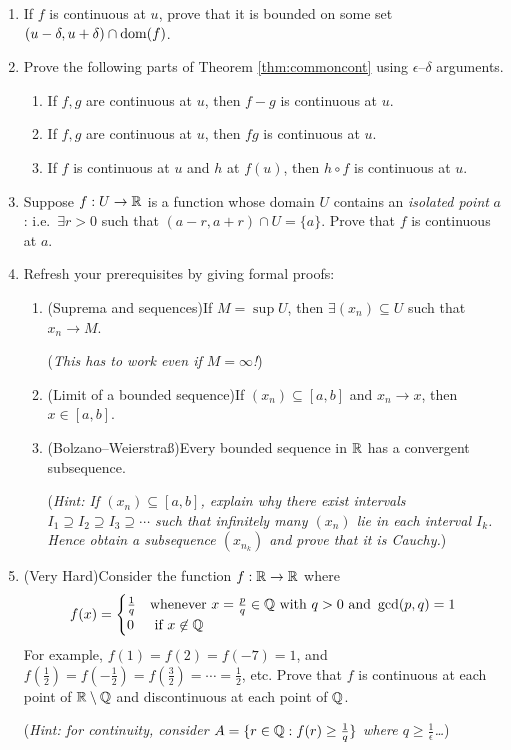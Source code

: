\begin{exercises}
\begin{enumerate}
		
		\item If $f$ is continuous at $u$, prove that it is bounded on some set $(u-\delta,u+\delta)\cap \operatorname{dom}(f)$.
	
	
		\item Prove the following parts of Theorem \ref{thm:commoncont} using $\epsilon$--$\delta$ arguments.
		\begin{enumerate}
	  	\item If $f,g$ are continuous at $u$, then $f-g$ is continuous at $u$.
	  	\item If $f,g$ are continuous at $u$, then $fg$ is continuous at $u$.
	  	\item If $f$ is continuous at $u$ and $h$ at $f(u)$, then $h\circ f$ is continuous at $u$.
		\end{enumerate}
	  
	  
	  \item\label{exs:isolatedcont} Suppose $f:U\to \mathbb{R}$ is a function whose domain $U$ contains an \emph{isolated point} $a$: i.e.\ $\exists r>0$ such that $(a-r,a+r)\cap U=\{a\}$. Prove that $f$ is continuous at $a$.
	  
	  
	  \item\label{exs:extremevaluelemma} Refresh your prerequisites by giving formal proofs:
	  \begin{enumerate}
	    \item (Suprema and sequences)\lstsp If $M=\sup U$, then $\exists (x_n)\subseteq U$ such that $x_n\to M$.\par
	    (\emph{This has to work even if $M=\infty$!})
	    \item (Limit of a bounded sequence)\lstsp If $(x_n)\subseteq[a,b]$ and $x_n\to x$, then $x\in [a,b]$.
			\item (Bolzano--Weierstraß)\lstsp Every bounded sequence in $\mathbb{R}$ has a convergent subsequence.\par
			(\emph{Hint: If $(x_n)\subseteq [a,b]$, explain why there exist intervals $I_1\supseteq I_2\supseteq I_3\supseteq\cdots$ such that \emph{infinitely many} $(x_n)$ lie in each interval $I_k$. Hence obtain a subsequence $(x_{n_k})$ and prove that it is \emph{Cauchy.}\footnotemark})
		\end{enumerate}
		
		
		\item (Very Hard)\lstsp Consider the function $f:\mathbb{R}\to\mathbb{R}$ where
		\[
			f(x)=
			\begin{cases}
				\frac 1q&\text{whenever }x=\frac pq\in\mathbb{Q}\text{ with }q>0\text{ and }\gcd(p,q)=1\\
				0&\text{ if }x\not\in\mathbb{Q}
			\end{cases}
		\]
	  For example, $f(1)=f(2)=f(-7)=1$, and $f(\tfrac 12)=f(-\tfrac 12)=f(\tfrac 32)=\cdots=\frac 12$, etc. Prove that $f$ is continuous at each point of $\mathbb{R}\setminus\mathbb{Q}$ and discontinuous at each point of $\mathbb{Q}$.\par
	  (\emph{Hint: for continuity, consider $A=\{r\in\mathbb{Q}:f(r)\ge \frac 1q\}$ where $q\ge \frac 1\epsilon$\ldots})
	\end{enumerate}
\end{exercises}


